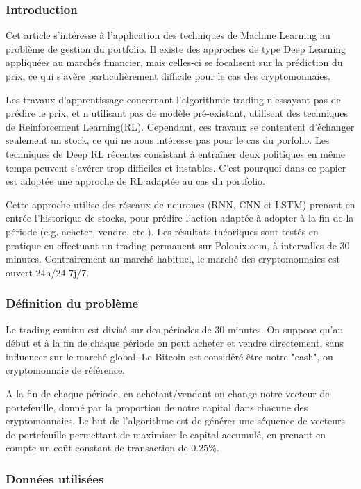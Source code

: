 \documentclass[a4paper]{article}
\begin{document}
{	\subsubsection{Introduction}
	Cet article s'intéresse à l'application des techniques de Machine Learning au problème de gestion du portfolio. Il existe des approches de type Deep Learning appliquées au marchés financier, mais celles-ci se focalisent sur la prédiction du prix, ce qui s'avère particulièrement difficile pour le cas des cryptomonnaies. 

	Les travaux d'apprentissage concernant l'algorithmic trading n'essayant pas de prédire le prix, et n'utilisant pas de modèle pré-existant, utilisent des techniques de Reinforcement Learning(RL). Cependant, ces travaux se contentent d'échanger seulement un stock, ce qui ne nous intéresse pas pour le cas du porfolio. Les techniques de Deep RL récentes consistant à entraîner deux politiques en même temps peuvent s'avérer trop difficiles et instables. C'est pourquoi dans ce papier est adoptée une approche de RL adaptée au cas du portfolio. 

	Cette approche utilise des réseaux de neurones (RNN, CNN et LSTM) prenant en entrée l'historique de stocks, pour prédire l'action adaptée à adopter à la fin de la période (e.g. acheter, vendre, etc.). Les résultats théoriques sont testés en pratique en effectuant un trading permanent sur Polonix.com, à intervalles de 30 minutes. Contrairement au marché habituel, le marché des cryptomonnaies est ouvert 24h/24 7j/7.

	\subsubsection{Définition du problème}

	Le trading continu est divisé sur des périodes de 30 minutes. On suppose qu'au début et à la fin de chaque période on peut acheter et vendre directement, sans influencer sur le marché global. Le Bitcoin est considéré être notre "cash", ou cryptomonnaie de référence. 

	A la fin de chaque période, en achetant/vendant on change notre vecteur de portefeuille, donné par la proportion de notre capital dans chacune des cryptomonnaies. Le but de l'algorithme est de générer une séquence de vecteurs de portefeuille permettant de maximiser le capital accumulé, en prenant en compte un coût constant de transaction de 0.25\%.

	\subsubsection{Données utilisées}

}
\end{document}
